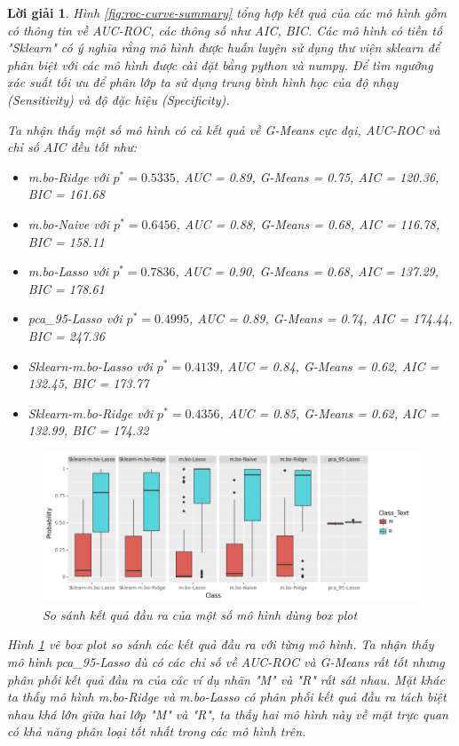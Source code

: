 \documentclass[14pt, a4paper]{article}
\theoremstyle{sltheorem}
\theoremstyle{soltheorem}
\newtheorem*{loigiai}{Lời giải}
\begin{document}
\begin{loigiai}
    Hình \ref{fig:roc-curve-summary} tổng hợp kết quả của các mô hình gồm có thông tin về AUC-ROC, các thông số như AIC, BIC.
    Các mô hình có tiền tố "Sklearn" có ý nghĩa rằng mô hình được huấn luyện sử dụng thư viện sklearn để phân biệt với các mô hình được cài đặt bằng python và numpy.
    Để tìm ngưỡng xác suất tối ưu để phân lớp ta sử dụng trung bình hình học của độ nhạy (Sensitivity) và độ đặc hiệu (Specificity).

    Ta nhận thấy một số mô hình có cả kết quả về G-Means cực đại, AUC-ROC và chỉ số AIC đều tốt như:

    \begin{itemize}
        \item m.bo-Ridge với $p^*=0.5335$, AUC = 0.89, G-Means = 0.75, AIC = 120.36, BIC = 161.68
        \item m.bo-Naive với $p^*=0.6456$, AUC = 0.88, G-Means = 0.68, AIC = 116.78, BIC = 158.11
        \item m.bo-Lasso với $p^*= 0.7836$, AUC = 0.90, G-Means = 0.68, AIC = 137.29, BIC = 178.61
        \item pca\_95-Lasso với $p^*= 0.4995$, AUC = 0.89, G-Means = 0.74, AIC = 174.44, BIC = 247.36
        \item Sklearn-m.bo-Lasso với $p^*= 0.4139$, AUC = 0.84, G-Means = 0.62, AIC = 132.45, BIC = 173.77
        \item Sklearn-m.bo-Ridge với $p^*= 0.4356$, AUC = 0.85, G-Means = 0.62, AIC = 132.99, BIC = 174.32
    \end{itemize}

    \begin{figure}[h!]
        \centering
        \includegraphics[width=1.0\textwidth]{figures/prob_box_plot.png}
        \caption{So sánh kết quả đầu ra của một số mô hình dùng box plot}
        \label{fig:prob-box-plot}
    \end{figure}

    Hình \ref{fig:prob-box-plot} vẽ box plot so sánh các kết quả đầu ra với từng mô hình.
    Ta nhận thấy mô hình pca\_95-Lasso dù có các chỉ số về AUC-ROC và G-Means rất tốt nhưng phân phối kết quả đầu ra của các ví dụ nhãn "M" và "R" rất sát nhau.
    Mặt khác ta thấy mô hình m.bo-Ridge và m.bo-Lasso có phân phối kết quả đầu ra tách biệt nhau khá lớn giữa hai lớp "M" và "R", ta thấy hai mô hình này về mặt trực quan có khả năng phân loại tốt nhất trong các mô hình trên.


\end{loigiai}
\end{document}
